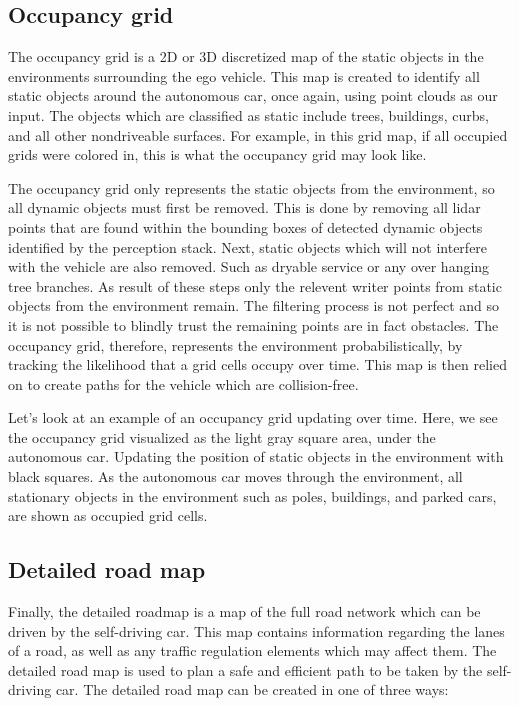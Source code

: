 \subsection{Occupancy grid}

The occupancy grid is a 2D or 3D discretized map of the static objects in the environments surrounding
the ego vehicle. This map is created to identify all static objects around the autonomous car, once again,
using point clouds as our input. The objects which are classified as
static include trees, buildings, curbs, and
all other nondriveable surfaces. For example, in this grid map,
if all occupied grids were colored in, this is what the occupancy
grid may look like. 


The occupancy grid only represents
the static objects from the environment, so all dynamic objects must first be removed. This is done by removing all lidar points
that are found within the bounding boxes of detected dynamic objects
identified by the perception stack. Next, static objects
which will not interfere with the vehicle are also removed. Such as dryable service or
any over hanging tree branches. As result of these steps only the relevent
writer points from static objects from the environment remain. The filtering process is not perfect and
so it is not possible to blindly trust the remaining points are in fact obstacles.
The occupancy grid, therefore, represents the environment probabilistically, by tracking the likelihood that
a grid cells occupy over time. This map is then relied on to create paths
for the vehicle which are collision-free. 

Let's look at an example of
an occupancy grid updating over time. Here, we see the occupancy grid
visualized as the light gray square area, under the autonomous car. Updating the position of static objects
in the environment with black squares. As the autonomous car moves
through the environment, all stationary objects in the environment
such as poles, buildings, and parked cars,
are shown as occupied grid cells. 


\subsection{Detailed road map}

Finally, the detailed roadmap is
a map of the full road network which can be driven by
the self-driving car. This map contains information
regarding the lanes of a road, as well as any traffic regulation
elements which may affect them. The detailed road map is
used to plan a safe and efficient path to be taken
by the self-driving car. The detailed road map can be
created in one of three ways:

